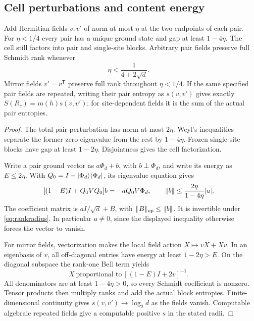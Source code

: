 \subsection{Cell perturbations and content energy}
\begin{proposition}\label{prop:pairfields}
Add Hermitian fields $v,v'$ of norm at most $\eta$ at the two endpoints
of each pair. For $\eta<1/4$ every pair has a unique ground state and
gap at least $1-4\eta$. The cell still factors into pair and single-site
blocks. Arbitrary pair fields preserve full Schmidt rank whenever
\begin{equation}\label{eq:rankradius}
 \eta<\frac1{4+2\sqrt d}.
\end{equation}
Mirror fields $v'=v^{\mathsf T}$ preserve full rank throughout
$\eta<1/4$. If the same specified pair fields are repeated, writing
their pair entropy as $s(v,v')$ gives exactly
$S(R_c)=m(h)s(v,v')$; for site-dependent fields it is the sum of the
actual pair entropies.
\end{proposition}
\begin{proof}
The total pair perturbation has norm at most $2\eta$. Weyl's
inequalities separate the former zero eigenvalue from the rest by
$1-4\eta$. Frozen single-site blocks have gap at least $1-2\eta$.
Disjointness gives the cell factorization.

Write a pair ground vector as $a\Phi_d+b$, with $b\perp\Phi_d$,
and write its energy as $E\leq2\eta$. With
$Q_0=I-\lvert\Phi_d\rangle\langle\Phi_d\rvert$, its eigenvalue equation gives
\[
 [(1-E)I+Q_0VQ_0]b=-aQ_0V\Phi_d,\qquad
 \lVert b\rVert\leq\frac{2\eta}{1-4\eta}|a|.
\]
The coefficient matrix is $aI/\sqrt d+B$, with
$\lVert B\rVert_{\rm op}\leq\lVert b\rVert$. It is invertible under
\eqref{eq:rankradius}. In particular $a\ne0$, since the displayed
inequality otherwise forces the vector to vanish.

For mirror fields, vectorization makes the local field action
$X\mapsto vX+Xv$. In an eigenbasis of $v$, all off-diagonal entries
have energy at least $1-2\eta>E$. On the diagonal subspace the
rank-one Bell term yields
\[
 X\ \text{proportional to}\ [(1-E)I+2v]^{-1}.
\]
All denominators are at least $1-4\eta>0$, so every Schmidt
coefficient is nonzero. Tensor products then multiply ranks and add
the actual block entropies. Finite-dimensional continuity gives
$s(v,v')\to\log_2d$ as the fields vanish. Computable algebraic repeated
fields give a computable positive $s$ in the stated radii.
\end{proof}

